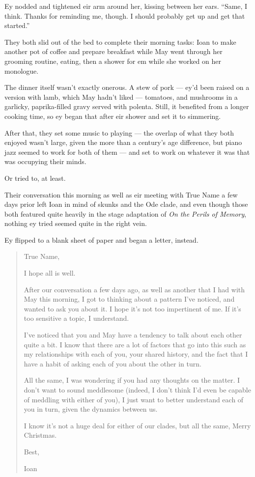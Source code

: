 Ey nodded and tightened eir arm around her, kissing between her ears. ``Same, I think. Thanks for reminding me, though. I should probably get up and get that started.''

They both slid out of the bed to complete their morning tasks: Ioan to make another pot of coffee and prepare breakfast while May went through her grooming routine, eating, then a shower for em while she worked on her monologue.

The dinner itself wasn't exactly onerous. A stew of pork — ey'd been raised on a version with lamb, which May hadn't liked — tomatoes, and mushrooms in a garlicky, paprika-filled gravy served with polenta. Still, it benefited from a longer cooking time, so ey began that after eir shower and set it to simmering.

After that, they set some music to playing — the overlap of what they both enjoyed wasn't large, given the more than a century's age difference, but piano jazz seemed to work for both of them — and set to work on whatever it was that was occupying their minds.

Or tried to, at least.

Their conversation this morning as well as eir meeting with True Name a few days prior left Ioan in mind of skunks and the Ode clade, and even though those both featured quite heavily in the stage adaptation of \emph{On the Perils of Memory}, nothing ey tried seemed quite in the right vein.

Ey flipped to a blank sheet of paper and began a letter, instead.

\begin{quote}
True Name,

I hope all is well.

After our conversation a few days ago, as well as another that I had with May this morning, I got to thinking about a pattern I've noticed, and wanted to ask you about it. I hope it's not too impertinent of me. If it's too sensitive a topic, I understand.

I've noticed that you and May have a tendency to talk about each other quite a bit. I know that there are a lot of factors that go into this such as my relationships with each of you, your shared history, and the fact that I have a habit of asking each of you about the other in turn.

All the same, I was wondering if you had any thoughts on the matter. I don't want to sound meddlesome (indeed, I don't think I'd even be capable of meddling with either of you), I just want to better understand each of you in turn, given the dynamics between us.

I know it's not a huge deal for either of our clades, but all the same, Merry Christmas.

Best,

Ioan
\end{quote}

